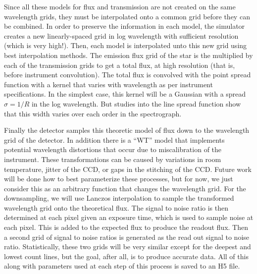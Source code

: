\documentclass[12pt]{article}
\begin{document}
Since all these models for flux and transmission are not  created on the same wavelength grids, they must be interpolated onto a common grid before they can be combined. In order to preserve the information in each model, the simulator creates a new linearly-spaced grid in log wavelength with sufficient resolution (which is very high!).
Then, each model is interpolated unto this new grid using best interpolation methods.
The emission flux grid of the star is the multiplied by each of the transmission grids to get a total flux, at high resolution (that is, before instrument convolution). The total flux is convolved with the point spread function with a kernel that varies with wavelength as per instrument specifications. In the simplest case, this kernel will be a Gaussian with a spread $\sigma = 1/R$ in the log wavelength. But studies into the line spread function show that this width varies over each order in the spectrograph.

Finally the detector samples this theoretic model of flux down to the wavelength grid of the detector. In addition there is a ``WT'' model that implements potential wavelength distortions that occur due to miscalibration of the instrument. These transformations can be caused by variations in room temperature, jitter of the CCD, or gaps in the stitching of the CCD. Future work will be done how to best parameterize these processes, but for now, we just consider this as an arbitrary function that changes the wavelength grid. For the downsampling, we will use Lanczos interpolation to sample the transformed wavelength grid onto the theoretical flux. The signal to noise ratio is then determined at each pixel given an exposure time, which is used to sample noise at each pixel. This is added to the expected flux to produce the readout flux. Then a second grid of signal to noise ratios is generated as the read out signal to noise ratio. Statistically, these two grids will be very similar except for the deepest and lowest count lines, but the goal, after all, is to produce accurate data. All of this along with parameters used at each step of this process is saved to an H5 file.
\end{document}
